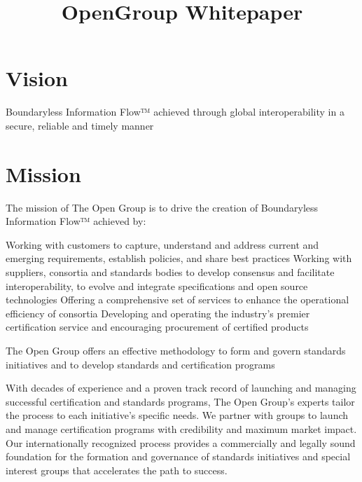 \documentclass[]{report}
\title{OpenGroup Whitepaper}
\begin{document}
	
	\maketitle
	
	\tableofcontents
	
	\pagestyle{fancy}	
	
	
	\chapter{Vision} Boundaryless Information Flow™ achieved through global interoperability in a secure, reliable and timely manner
	
	\chapter{Mission}
	
	The mission of The Open Group is to drive the creation of Boundaryless Information Flow™ achieved by:
	
	Working with customers to capture, understand and address current and emerging requirements, establish policies, and share best practices
	Working with suppliers, consortia and standards bodies to develop consensus and facilitate interoperability, to evolve and integrate specifications and open source technologies
	Offering a comprehensive set of services to enhance the operational efficiency of consortia
	Developing and operating the industry's premier certification service and encouraging procurement of certified products
	
	The Open Group offers an effective methodology to form and govern standards initiatives and to develop standards and certification programs
	
	With decades of experience and a proven track record of launching and managing successful certification and standards programs, The Open Group’s experts tailor the process to each initiative’s specific needs. We partner with groups to launch and manage certification programs with credibility and maximum market impact. Our internationally recognized process provides a commercially and legally sound foundation for the formation and governance of standards initiatives and special interest groups that accelerates the path to success.
	
\end{document}
